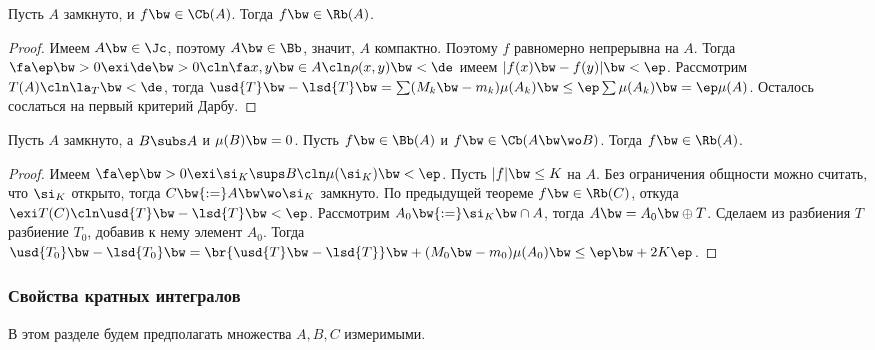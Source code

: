 \documentclass[a4paper]{article}
\begin{document}
\begin{theorem}
Пусть $A$ замкнуто, и $f \bw\in \Cb(A)$. Тогда $f \bw\in \Rb(A)$.
\end{theorem}
\begin{proof}
Имеем $A \bw\in \Jc$, поэтому $A \bw\in \Bb$, значит, $A$ компактно. Поэтому $f$ равномерно непрерывна на
$A$. Тогда $\fa \ep \bw> 0 \exi \de \bw> 0\cln \fa x, y \bw\in A\cln \rho(x,y) \bw< \de$ имеем $|f(x) \bw- f(y)| \bw<
\ep$. Рассмотрим $T(A)\cln \la_T \bw< \de$, тогда $\usd{T} \bw- \lsd{T} \bw= \sum (M_k\bw-m_k) \mu(A_k) \bw\le
\ep \sum \mu(A_k) \bw= \ep\mu(A)$. Осталось сослаться на первый критерий Дарбу.
\end{proof}

\begin{theorem}
Пусть $A$ замкнуто, а $B \subs A$ и $ \mu(B) \bw= 0$. Пусть $f \bw\in \Bb(A)$ и $f \bw\in \Cb(A\bw\wo B)$. Тогда
$f \bw\in \Rb(A)$.
\end{theorem}
\begin{proof}
Имеем $\fa \ep \bw> 0 \exi \si_K \sups B\cln \mu(\si_K) \bw< \ep$. Пусть $|f| \bw\le K$ на $A$.
Без ограничения общности можно считать, что $\si_K$ открыто, тогда $C \bw{:=} A \bw\wo \si_K$ замкнуто.
По предыдущей теореме $f \bw\in \Rb(C)$, откуда $\exi T(C)\cln \usd{T} \bw- \lsd{T} \bw< \ep$.
Рассмотрим $A_0 \bw{:=} \si_K \bw\cap A$, тогда $A \bw= A_0 \bw\oplus T$.
Сделаем из разбиения $T$ разбиение $T_0$, добавив к нему элемент $A_0$. Тогда
$\usd{T_0} \bw- \lsd{T_0} \bw= \br{\usd{T}\bw-\lsd{T}} \bw+ (M_0 \bw- m_0) \mu(A_0) \bw\le \ep \bw+ 2K\ep$.
\end{proof}

\subsubsection{Свойства кратных интегралов}

В этом разделе будем предполагать множества $A, B, C$ измеримыми.
\end{document}
